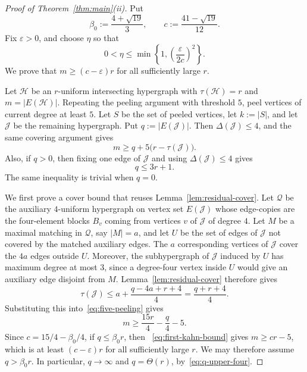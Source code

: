 \documentclass[10pt,a4paper]{amsart}
\newcommand{\Del}{\Delta}
\newcommand{\cH}{\mathcal H}
\newcommand{\cJ}{\mathcal J}
\newcommand{\cQ}{\mathcal Q}
\newcommand{\ta}{\tau}
\begin{document}
\begin{proof}[Proof of Theorem~\ref{thm:main}(ii)]
Put
\[
  \beta_0:=\frac{4+\sqrt{19}}{3},
  \qquad
  c:=\frac{41-\sqrt{19}}{12}.
\]
Fix $\varepsilon>0$, and choose $\eta$ so that
\[
  0<\eta\le
  \min\left\{1,\left(\frac{\varepsilon}{2c}\right)^2\right\}.
\]
We prove that $m\ge (c-\varepsilon)r$ for all sufficiently large $r$.

Let $\cH$ be an $r$-uniform intersecting hypergraph with $\ta(\cH)=r$ and
$m=|E(\cH)|$.  Repeating the peeling argument with threshold $5$, peel
vertices of current degree at least $5$.  Let $S$ be the set of peeled
vertices, let $k:=|S|$, and let $\cJ$ be the remaining hypergraph.  Put
$q:=|E(\cJ)|$.  Then $\Del(\cJ)\le 4$, and the same covering argument gives
\begin{equation}\label{eq:five-peeling}
  m\ge q+5\bigl(r-\ta(\cJ)\bigr).
\end{equation}
Also, if $q>0$, then fixing one edge of $\cJ$ and using $\Del(\cJ)\le 4$
gives
\begin{equation}\label{eq:q-upper-four}
  q\le 3r+1.
\end{equation}
The same inequality is trivial when $q=0$.

We first prove a cover bound that reuses Lemma~\ref{lem:residual-cover}.  Let
$\cQ$ be the auxiliary $4$-uniform hypergraph on vertex set $E(\cJ)$ whose
edge-copies are the four-element blocks $B_v$ coming from vertices $v$ of
$\cJ$ of degree $4$.  Let $M$ be a maximal matching in $\cQ$, say
$|M|=a$, and let $U$ be the set of edges of $\cJ$ not covered by the matched
auxiliary edges.  The $a$ corresponding vertices of $\cJ$ cover the
$4a$ edges outside $U$.  Moreover, the subhypergraph of $\cJ$ induced by $U$
has maximum degree at most $3$, since a degree-four vertex inside $U$ would
give an auxiliary edge disjoint from $M$.  Lemma~\ref{lem:residual-cover}
therefore gives
\[
  \ta(\cJ)\le a+\frac{q-4a+r+4}{4}
  =\frac{q+r+4}{4}.
\]
Substituting this into~\eqref{eq:five-peeling} gives
\begin{equation}\label{eq:first-kahn-bound}
  m\ge \frac{15r}{4}-\frac q4-5.
\end{equation}
Since $c=15/4-\beta_0/4$, if $q\le\beta_0r$, then
~\eqref{eq:first-kahn-bound} gives $m\ge cr-5$, which is at least
$(c-\varepsilon)r$ for all sufficiently large $r$.  We may therefore assume
$q>\beta_0r$.  In particular, $q\to\infty$ and $q=\Theta(r)$,
by~\eqref{eq:q-upper-four}.


\end{proof}
\end{document}

